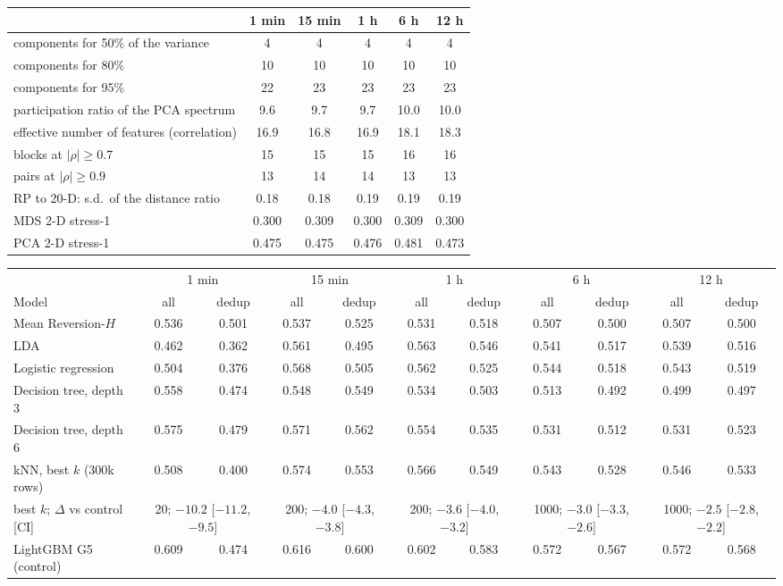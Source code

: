 \begin{tabular}{lccccc}
\toprule
& 1 min & 15 min & 1 h & 6 h & 12 h \\
\midrule
components for 50\% of the variance & 4 & 4 & 4 & 4 & 4 \\
components for 80\% & 10 & 10 & 10 & 10 & 10 \\
components for 95\% & 22 & 23 & 23 & 23 & 23 \\
participation ratio of the PCA spectrum & 9.6 & 9.7 & 9.7 & 10.0 & 10.0 \\
effective number of features (correlation) & 16.9 & 16.8 & 16.9 & 18.1 & 18.3 \\
blocks at $|\rho| \ge 0.7$ & 15 & 15 & 15 & 16 & 16 \\
pairs at $|\rho| \ge 0.9$ & 13 & 14 & 14 & 13 & 13 \\
RP to 20-D: s.d.\ of the distance ratio & 0.18 & 0.18 & 0.19 & 0.19 & 0.19 \\
MDS 2-D stress-1 & 0.300 & 0.309 & 0.300 & 0.309 & 0.300 \\
PCA 2-D stress-1 & 0.475 & 0.475 & 0.476 & 0.481 & 0.473 \\
\bottomrule
\end{tabular}

\begin{tabular}{lcccccccccc}
\toprule
& \multicolumn{2}{c}{1 min} & \multicolumn{2}{c}{15 min} & \multicolumn{2}{c}{1 h} & \multicolumn{2}{c}{6 h} & \multicolumn{2}{c}{12 h} \\
\cmidrule(lr){2-3}\cmidrule(lr){4-5}\cmidrule(lr){6-7}\cmidrule(lr){8-9}\cmidrule(lr){10-11}
Model & all & dedup & all & dedup & all & dedup & all & dedup & all & dedup \\
\midrule
Mean Reversion-$H$ & 0.536 & 0.501 & 0.537 & 0.525 & 0.531 & 0.518 & 0.507 & 0.500 & 0.507 & 0.500 \\
LDA & 0.462 & 0.362 & 0.561 & 0.495 & 0.563 & 0.546 & 0.541 & 0.517 & 0.539 & 0.516 \\
Logistic regression & 0.504 & 0.376 & 0.568 & 0.505 & 0.562 & 0.525 & 0.544 & 0.518 & 0.543 & 0.519 \\
Decision tree, depth 3 & 0.558 & 0.474 & 0.548 & 0.549 & 0.534 & 0.503 & 0.513 & 0.492 & 0.499 & 0.497 \\
Decision tree, depth 6 & 0.575 & 0.479 & 0.571 & 0.562 & 0.554 & 0.535 & 0.531 & 0.512 & 0.531 & 0.523 \\
kNN, best $k$ (300k rows) & 0.508 & 0.400 & 0.574 & 0.553 & 0.566 & 0.549 & 0.543 & 0.528 & 0.546 & 0.533 \\
\quad best $k$; $\Delta$ vs control [CI] & \multicolumn{2}{c}{20; $-10.2$ [$-11.2$, $-9.5$]} & \multicolumn{2}{c}{200; $-4.0$ [$-4.3$, $-3.8$]} & \multicolumn{2}{c}{200; $-3.6$ [$-4.0$, $-3.2$]} & \multicolumn{2}{c}{1000; $-3.0$ [$-3.3$, $-2.6$]} & \multicolumn{2}{c}{1000; $-2.5$ [$-2.8$, $-2.2$]} \\
LightGBM G5 (control) & 0.609 & 0.474 & 0.616 & 0.600 & 0.602 & 0.583 & 0.572 & 0.567 & 0.572 & 0.568 \\
\bottomrule
\end{tabular}

